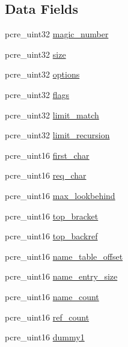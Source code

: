 \subsection*{Data Fields}
\begin{DoxyCompactItemize}
\item 
pcre\+\_\+uint32 \hyperlink{structreal__pcre8__or__16_a01bbc328e5c13051c52d7cb904ae6d4d}{magic\+\_\+number}
\item 
pcre\+\_\+uint32 \hyperlink{structreal__pcre8__or__16_ac93af4cf39d0e2a1e02ea9451678186f}{size}
\item 
pcre\+\_\+uint32 \hyperlink{structreal__pcre8__or__16_acbfe3eba58c74e3eee9a78bce8ba79f9}{options}
\item 
pcre\+\_\+uint32 \hyperlink{structreal__pcre8__or__16_a0bf7aa55541c5e54ce2164660343ae6d}{flags}
\item 
pcre\+\_\+uint32 \hyperlink{structreal__pcre8__or__16_a1809b1acd67c65c934c1d75e1257f5f4}{limit\+\_\+match}
\item 
pcre\+\_\+uint32 \hyperlink{structreal__pcre8__or__16_a72d9a6faa07b5cd24b8bb18d23679725}{limit\+\_\+recursion}
\item 
pcre\+\_\+uint16 \hyperlink{structreal__pcre8__or__16_ad2e6a71e484718c17187f70ec09e9d57}{first\+\_\+char}
\item 
pcre\+\_\+uint16 \hyperlink{structreal__pcre8__or__16_a59bf4da22e53e769a49bd35f1759ff2d}{req\+\_\+char}
\item 
pcre\+\_\+uint16 \hyperlink{structreal__pcre8__or__16_a33a79522ea0d3984cdf8fe195e5697bc}{max\+\_\+lookbehind}
\item 
pcre\+\_\+uint16 \hyperlink{structreal__pcre8__or__16_aa3d9e64918a0c439deb9fb8d8b619926}{top\+\_\+bracket}
\item 
pcre\+\_\+uint16 \hyperlink{structreal__pcre8__or__16_ad48ad3b363bb1beff210abb33a9596a8}{top\+\_\+backref}
\item 
pcre\+\_\+uint16 \hyperlink{structreal__pcre8__or__16_a981b663132d047a31aa870b1201fccd3}{name\+\_\+table\+\_\+offset}
\item 
pcre\+\_\+uint16 \hyperlink{structreal__pcre8__or__16_ac13959b571c9d74382cdf98849ff9f63}{name\+\_\+entry\+\_\+size}
\item 
pcre\+\_\+uint16 \hyperlink{structreal__pcre8__or__16_a3ab802445a411694fd95138fb8b1e995}{name\+\_\+count}
\item 
pcre\+\_\+uint16 \hyperlink{structreal__pcre8__or__16_a023ab002f32f9aaa8d18ea802984c383}{ref\+\_\+count}
\item 
pcre\+\_\+uint16 \hyperlink{structreal__pcre8__or__16_a64619216634de06ee8d09327668e9b77}{dummy1}

\end{DoxyCompactItemize}
